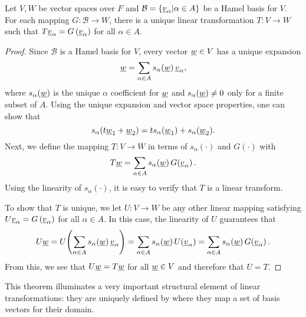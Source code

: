 \begin{theorem} \label{theorem:UniqueLinearTransformation}
Let $V,W$ be vector spaces over $F$ and $\mathcal{B} = \{ \underline{v}_{\alpha} | \alpha \in A \}$ be a Hamel basis for $V$.
For each mapping $G \colon \mathcal{B} \rightarrow W$, there is a unique linear transformation $T \colon V \rightarrow W$ such that $T \underline{v}_{\alpha} = G \left( \underline{v}_{\alpha} \right)$ for all $\alpha \in A$.
\end{theorem}
\begin{proof}
Since $\mathcal{B}$ is a Hamel basis for $V$, every vector $\underline{w} \in V$ has a unique expansion
\begin{equation*}
\underline{w} = \sum_{\alpha \in A} s_{\alpha} (\underline{w}) \, \underline{v}_{\alpha},
\end{equation*}
where $s_\alpha (\underline{w})$ is the unique $\alpha$ coefficient for $\underline{w}$ and $s_{\alpha} (\underline{w}) \neq 0$ only for a finite subset of $A$.
Using the unique expansion and vector space properties, one can show that
\[ s_\alpha (t \underline{w}_1 + \underline{w}_2) = t s_\alpha (\underline{w}_1) + s_\alpha (\underline{w}_2). \]
Next, we define the mapping $T \colon V\to W$ in terms of $s_\alpha(\cdot)$ and $G(\cdot)$ with
\begin{equation*}
T \underline{w} = \sum_{\alpha \in A} s_{\alpha} (\underline{w}) \, G \! \left( \underline{v}_{\alpha} \right).
\end{equation*}
Using the linearity of $s_\alpha(\cdot)$, it is easy to verify that $T$ is a linear transform.

To show that $T$ is unique, we let $U \colon V \rightarrow W$ be any other linear mapping satisfying $U \underline{v}_{\alpha} = G \left( \underline{v}_{\alpha} \right)$ for all $\alpha \in A$.
In this case, the linearity of $U$ guarantees that
\begin{equation*}
U \underline{w} = U \! \left( \sum_{\alpha \in A} s_{\alpha} (\underline{w}) \, \underline{v}_{\alpha} \right)
=  \sum_{\alpha \in A} s_{\alpha} (\underline{w}) \, U \! \left( \underline{v}_{\alpha} \right) 
=  \sum_{\alpha \in A} s_{\alpha}(\underline{w}) \, G \! \left( \underline{v}_{\alpha} \right).
\end{equation*}
From this, we see that $U \underline{w} = T \underline{w}$ for all $\underline{w} \in V$ and therefore that $U = T$.
\end{proof}

This theorem illuminates a very important structural element of linear transformations: they are uniquely defined by where they map a set of basis vectors for their domain.

